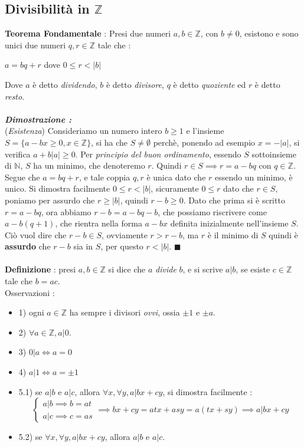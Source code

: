 \documentclass[12pt, letterpaper]{article}
\begin{document}
\subsection{Divisibilità in \(\mathbb{Z}\)}
\textbf{Teorema Fondamentale} : Presi due numeri \(a,b\in\mathbb{Z}\), con \(b\ne0\), esistono e sono unici due 
numeri \(q,r\in\mathbb{Z}\) tale che :\begin{center}
    \(a=bq+r\) dove \(0\le r < |b|\)
\end{center}
Dove \(a\) è detto \textit{dividendo}, \(b\) è detto \textit{divisore}, \(q\) è detto \textit{quoziente} ed
\(r\) è detto \textit{resto}.\\ \hphantom{.}\\ \textbf{\textit{Dimostrazione :}}\\
(\textit{Esistenza}) Consideriamo un numero intero \(b\ge1\) e l'insieme \(S=\{a-bx\ge0,x\in \mathbb{Z}\}\), si 
ha che \(S\ne\emptyset\) perchè, ponendo ad esempio \(x=-|a|\), si verifica \(a+b|a|\ge 0\). Per \textit{principio del 
buon ordinamento}, essendo \(S\) sottoinsieme di \(\mathbb{N}\), \(S\) ha un minimo, che denoteremo \(r\). Quindi 
\(r\in S \implies r= a-bq\) con \(q\in\mathbb{Z}\). Segue che \(a=bq+r\), e tale coppia \(q,r\) è unica dato che 
\(r\) essendo un minimo, è unico. Si dimostra facilmente \(0\le r < |b|\), sicuramente \(0\le r\) dato 
che \(r\in S\), poniamo per assurdo che \(r\ge |b|\), quindi \(r-b\ge 0\). 
Dato che prima si è scritto \( r= a-bq\), ora abbiamo  \( r-b= a-bq-b\), che possiamo riscrivere come 
\(a-b(q+1)\), che rientra nella forma \(a-bx\) definita inizialmente nell'insieme \(S\). Ciò vuol dire che 
\(r-b\in  S\), ovviamente \(r>r-b\), ma \(r\) è il minimo di \(S\) quindi è \textbf{assurdo} che \(r-b\) sia 
in \(S\), per questo \(r<|b|\). \(\blacksquare\)\\\hphantom{.}\\
\textbf{Definizione }: presi \(a,b\in\mathbb{Z}\) si dice che \(a\) \textit{divide} \(b\), e si scrive 
\(a|b\), se esiste \(c\in\mathbb{Z}\) tale che \(b=ac\).\\
Osservazioni :\begin{itemize}
    \item 1) ogni \(a\in\mathbb{Z}\) ha sempre i divisori \textit{ovvi}, ossia \(\pm 1\) e \(\pm a\).
    \item 2) \(\forall a\in\mathbb{Z}, a|0\).
    \item 3) \(0|a \iff a=0\)
    \item 4) \(a|1 \iff a=\pm 1\)
    \item 5.1) se \(a|b\) e \(a|c\), allora \(\forall x,\forall y,a|bx+cy\), si dimostra facilmente :\begin{equation}
        \begin{cases}
            a|b \implies b = at
            \\a|c \implies c = as
        \end{cases}\implies bx+cy = atx+asy=a(tx+sy)\implies a|bx+cy
    \end{equation}
    \item 5.2) se \(\forall x,\forall y,a|bx+cy\), allora \(a|b\) e \(a|c\).
\end{itemize}
\end{document}
